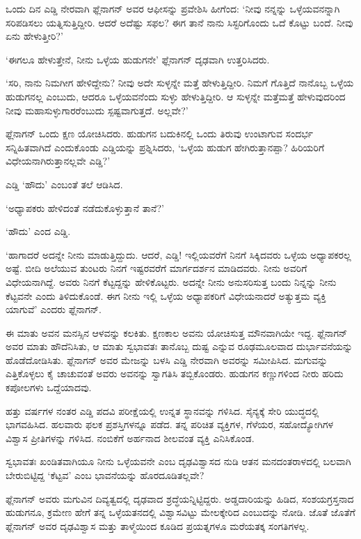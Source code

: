 ಒಂದು ದಿನ ಎಡ್ಡಿ ನೇರವಾಗಿ ಫ್ಲೆನಾಗನ್ ಅವರ ಆಫೀಸನ್ನು ಪ್ರವೇಶಿಸಿ ಹೀಗೆಂದ: ‘ನೀವು ನನ್ನನ್ನು ಒಳ್ಳೆಯವನನ್ನಾಗಿ ಸರಿಪಡಿಸಲು ಯತ್ನಿಸುತ್ತಿದ್ದೀರಿ. ಆದರೆ ಅದೆಷ್ಟು ಸಫಲ? ಈಗ ತಾನೆ ನಾನು ಸಿಸ್ಟರಿಗೊಂದು ಒದೆ ಕೊಟ್ಟು ಬಂದೆ. ನೀವು ಏನು ಹೇಳುತ್ತೀರಿ?’

‘ಈಗಲೂ ಹೇಳುತ್ತೇನೆ, ನೀನು ಒಳ್ಳೆಯ ಹುಡುಗನೇ’ ಫ್ಲೆನಾಗನ್ ದೃಢವಾಗಿ ಉತ್ತರಿಸಿದರು.

‘ಸರಿ, ನಾನು ನಿಮಗೀಗ ಹೇಳಿದ್ದೇನು? ನೀವು ಅದೇ ಸುಳ್ಳನ್ನೇ ಮತ್ತೆ ಹೇಳುತ್ತಿದ್ದೀರಿ. ನಿಮಗೆ ಗೊತ್ತಿದೆ ನಾನೊಬ್ಬ ಒಳ್ಳೆಯ ಹುಡುಗನಲ್ಲ ಎಂಬುದು, ಆದರೂ ಒಳ್ಳೆಯವನೆಂದು ಸುಳ್ಳು ಹೇಳುತ್ತಿದ್ದೀರಿ. ಆ ಸುಳ್ಳನ್ನೇ ಮತ್ತೆಮತ್ತೆ ಹೇಳುವುದರಿಂದ ನೀವು ಮಹಾಸುಳ್ಳುಗಾರರೆಂಬುದು ಸ್ಪಷ್ಟವಾಗುತ್ತದೆ. ಅಲ್ಲವೇ?’

ಫ್ಲೆನಾಗನ್ ಒಂದು ಕ್ಷಣ ಯೋಚಿಸಿದರು. ಹುಡುಗನ ಬದುಕಿನಲ್ಲಿ ಒಂದು ತಿರುವು ಉಂಟಾ\-ಗುವ ಸಂದರ್ಭ ಸನ್ನಿಹಿತವಾಗಿದೆ ಎಂದುಕೊಂಡು ಎಡ್ಡಿಯನ್ನು ಪ್ರಶ್ನಿಸಿದರು, ‘ಒಳ್ಳೆಯ ಹುಡುಗ ಹೇಗಿರುತ್ತಾನಪ್ಪಾ? ಹಿರಿಯರಿಗೆ ವಿಧೇಯನಾಗಿರುತ್ತಾನಲ್ಲವೇ ಎಡ್ಡಿ?’

ಎಡ್ಡಿ ‘ಹೌದು’ ಎಂಬಂತೆ ತಲೆ ಆಡಿಸಿದ.

‘ಅಧ್ಯಾಪಕರು ಹೇಳಿದಂತೆ ನಡೆದುಕೊಳ್ಳುತ್ತಾನೆ ತಾನೆ?’

‘ಹೌದು’ ಎಂದ ಎಡ್ಡಿ.

‘ಹಾಗಾದರೆ ಅದನ್ನೇ ನೀನು ಮಾಡುತ್ತಿದ್ದುದು. ಆದರೆ, ಎಡ್ಡಿ! ಇಲ್ಲಿಯವರೆಗೆ ನಿನಗೆ ಸಿಕ್ಕಿದವರು ಒಳ್ಳೆಯ ಅಧ್ಯಾಪಕರಲ್ಲ ಅಷ್ಟೆ. ಬೀದಿ ಅಲೆಯುವ ತುಂಟರು ನಿನಗೆ ಇಷ್ಟರವರೆಗೆ ಮಾರ್ಗದರ್ಶನ ಮಾಡಿದವರು. ನೀನು ಅವರಿಗೆ ವಿಧೇಯನಾಗಿದ್ದೆ. ಅವರು ನಿನಗೆ ಕೆಟ್ಟದ್ದನ್ನು ಹೇಳಿಕೊಟ್ಟರು. ಅದನ್ನೇ ನೀನು ಅನುಸರಿಸುತ್ತ ಬಂದು ನಿನ್ನನ್ನು ನೀನು ಕೆಟ್ಟವನೇ ಎಂದು ತಿಳಿದುಕೊಂಡೆ. ಈಗ ನೀನು ಇಲ್ಲಿ ಒಳ್ಳೆಯ ಅಧ್ಯಾಪಕರಿಗೆ ವಿಧೇಯನಾದರೆ ಅತ್ಯುತ್ತಮ ವ್ಯಕ್ತಿ ಯಾಗುವೆ’ ಎಂದರು ಫ್ಲೆನಾಗನ್.

ಈ ಮಾತು ಅವನ ಮನಸ್ಸಿನ ಆಳವನ್ನು ಕಲಕಿತು. ಕ್ಷಣಕಾಲ ಅವನು ಯೋಚಿಸುತ್ತ ಮೌನ\-ವಾಗಿಯೇ ಇದ್ದ. ಫ್ಲೆನಾಗನ್ ಅವರ ಮಾತು ಹೌದೆನಿಸಿತು, ಆ ಮಾತು ಸ್ವಭಾವತಃ ತಾನೊಬ್ಬ ದುಷ್ಟ ಎನ್ನುವ ರೂಢಮೂಲವಾದ ದುರ್ಭಾವನೆಯನ್ನು ಹೊಡೆದೋಡಿಸಿತು. ಫ್ಲೆನಾಗನ್ ಅವರ ಮೇಜನ್ನು ಬಳಸಿ ಎಡ್ಡಿ ನೇರವಾಗಿ ಅವರನ್ನು ಸಮೀಪಿಸಿದ. ಮಗುವನ್ನು ಎತ್ತಿಕೊಳ್ಳಲು ಕೈ ಚಾಚುವಂತೆ ಅವರು ಅವನನ್ನು ಸ್ವಾಗತಿಸಿ ತಬ್ಬಿಕೊಂಡರು. ಹುಡುಗನ ಕಣ್ಣುಗಳಿಂದ ನೀರು ಹರಿದು ಕಪೋಲಗಳು ಒದ್ದೆಯಾದವು.

ಹತ್ತು ವರ್ಷಗಳ ನಂತರ ಎಡ್ಡಿ ಪದವಿ ಪರೀಕ್ಷೆಯಲ್ಲಿ ಉನ್ನತ ಸ್ಥಾನವನ್ನು ಗಳಿಸಿದ. ಸೈನ್ಯಕ್ಕೆ ಸೇರಿ ಯುದ್ಧದಲ್ಲಿ ಭಾಗವಹಿಸಿದ. ಹಲವಾರು ಫಲಕ ಪ್ರಶಸ್ತಿಗಳನ್ನೂ ಪಡೆದ. ತನ್ನ ಪರಿಚಿತ ವ್ಯಕ್ತಿಗಳ, ಗೆಳೆಯರ, ಸಹೋದ್ಯೋಗಿಗಳ ವಿಶ್ವಾಸ ಪ್ರೀತಿಗಳನ್ನು ಗಳಿಸಿದ. ನಂಬಿಕೆಗೆ ಅರ್ಹನಾದ ಶೀಲವಂತ ವ್ಯಕ್ತಿ ಎನಿಸಿಕೊಂಡ.

ಸ್ವಭಾವತಃ ಖಂಡಿತವಾಗಿಯೂ ನೀನು ಒಳ್ಳೆಯವನೇ ಎಂಬ ದೃಢವಿಶ್ವಾಸದ ನುಡಿ ಆತನ ಮನದಂತರಾಳದಲ್ಲಿ ಬಲವಾಗಿ ಬೇರುಬಿಟ್ಟಿದ್ದ ‘ಕೆಟ್ಟವ’ ಎಂಬ ಭಾವನೆಯನ್ನು ಹೊರದೂಡಿ\-ತಲ್ಲವೇ?

ಫ್ಲೆನಾಗನ್ ಅವರು ಮಗುವಿನ ದಿವ್ಯತ್ವದಲ್ಲಿ ದೃಢವಾದ ಶ್ರದ್ಧೆಯನ್ನಿಟ್ಟಿದ್ದರು. ಅಡ್ಡದಾರಿಯನ್ನು ಹಿಡಿದ, ಸಂಶಯಗ್ರಸ್ತನಾದ ಹುಡುಗನೂ, ಕ್ರಮೇಣ ಹೇಗೆ ತನ್ನ ಒಳ್ಳೆಯತನದಲ್ಲಿ ವಿಶ್ವಾಸವಿಟ್ಟು ಮೇಲಕ್ಕೇರಿದ ಎಂಬುದನ್ನು ನೋಡಿ. ಜೊತೆ ಜೊತೆಗೆ ಫ್ಲೆನಾಗನ್ ಅವರ ದೃಢವಿಶ್ವಾಸ ಮತ್ತು ತಾಳ್ಮೆಯಿಂದ ಕೂಡಿದ ಪ್ರಯತ್ನಗಳೂ ಮರೆಯತಕ್ಕ ಸಂಗತಿಗಳಲ್ಲ.



